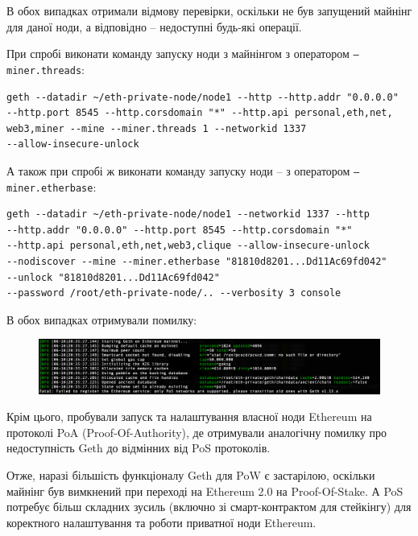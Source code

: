В обох випадках отримали відмову перевірки, оскільки не був запущений майнінг для даної ноди, а відповідно -- недоступні будь-які операції.


При спробі виконати команду запуску ноди з майнінгом з оператором \texttt{--miner.threads}:
\begin{verbatim}
geth --datadir ~/eth-private-node/node1 --http --http.addr "0.0.0.0" 
--http.port 8545 --http.corsdomain "*" --http.api personal,eth,net,
web3,miner --mine --miner.threads 1 --networkid 1337
--allow-insecure-unlock
\end{verbatim}

А також при спробі ж виконати команду запуску ноди – з оператором \texttt{--miner.etherbase}:
\begin{verbatim}
geth --datadir ~/eth-private-node/node1 --networkid 1337 --http 
--http.addr "0.0.0.0" --http.port 8545 --http.corsdomain "*" 
--http.api personal,eth,net,web3,clique --allow-insecure-unlock 
--nodiscover --mine --miner.etherbase "81810d8201...Dd11Ac69fd042" 
--unlock "81810d8201...Dd11Ac69fd042" 
--password /root/eth-private-node/.. --verbosity 3 console
\end{verbatim}

\newpage
В обох випадках отримували помилку:
\begin{figure}[h!]
        \centering
        \includegraphics[scale=0.35]{IMAGES/onlyPoSError.png}
        \label{fig_pacman}
\end{figure}

Крім цього, пробували запуск та налаштування власної ноди Ethereum на протоколі PoA (Proof-Of-Authority), де отримували аналогічну помилку про недоступність Geth до відмінних від PoS протоколів.

\chapconclude{\ref{chap:review}}

Отже, наразі більшість функціоналу Geth для PoW є застарілою, оскільки майнінг був вимкнений при переході на Ethereum 2.0 на Proof-Of-Stake. А PoS потребує більш складних зусиль (включно зі смарт-контрактом для стейкінгу) для коректного налаштування та роботи приватної ноди Ethereum.